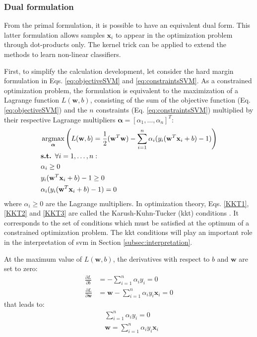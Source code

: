 \subsubsection{Dual formulation}
\label{sec:dualSVM}
From the primal formulation, it is possible to have an equivalent dual form. This latter formulation allows samples $\textbf{x}_i$ to appear in the optimization problem through dot-products only. The kernel trick can be applied to extend the methods to learn non-linear classifiers.

First, to simplify the calculation development, let consider the hard margin formulation in Eqs. \ref{eq:objectiveSVM} and \ref{eq:constraintsSVM}. As a constrained optimization problem, the formulation is equivalent to the maximization of a Lagrange function $L(\textbf{w},b)$, consisting of the sum of the objective function (Eq. \ref{eq:objectiveSVM}) and the $n$ constraints (Eq. \ref{eq:constraintsSVM}) multiplied by their respective Lagrange multipliers $\boldsymbol{\alpha} = [\alpha_1, \ldots, \alpha_n]^T$: 
\begin{align}
	& \argmax_{\boldsymbol{\alpha}} \left( L(\textbf{w},b) = \frac{1}{2}(\textbf{w}^T\textbf{w})-\sum\limits_{i=1}^{n}\alpha_i(y_i(\textbf{w}^T\textbf{x}_i+b)-1) \right) \label{eq:Lagrange} \\
	& \textbf{s.t. } \forall i = 1,\ldots,n: \nonumber \\
	& \alpha_i \geq 0 \label{KKT1}\\
	& y_i(\textbf{w}^T\textbf{x}_i+b)-1 \geq 0 \label{KKT2}\\
	& \alpha_i (y_i(\textbf{w}^T\textbf{x}_i+b)-1) = 0 \label{KKT3}
\end{align}
\noindent where $\alpha_i \geq 0$ are the Lagrange multipliers. In optimization theory, Eqs. \ref{KKT1}, \ref{KKT2} and \ref{KKT3} are called the Karush-Kuhn-Tucker ({\sc kkt}) conditions \cite{Bishop2006}. It corresponds to the set of conditions which must be satisfied at the optimum of a constrained optimization problem. The {\sc kkt} conditions will play an important role in the interpretation of {\sc svm} in Section \ref{subsec:interpretation}. 

\noindent At the maximum value of $L(\textbf{w},b)$, the derivatives with respect to $b$ and $\textbf{w}$ are set to zero:
\begin{align*}
\frac{\partial L}{\partial b} &= - \sum\limits_{i=1}^{n}\alpha_i y_i = 0 \\
\frac{\partial L}{\partial \textbf{w}} &= \textbf{w}-\sum\limits_{i=1}^{n}\alpha_i y_i \textbf{x}_i = 0
\end{align*}
\noindent that leads to:
\begin{align}
&\sum\limits_{i=1}^{n}\alpha_i y_i = 0 \\
& \textbf{w} = \sum\limits_{i=1}^{n}\alpha_i y_i \textbf{x}_i
\end{align}

